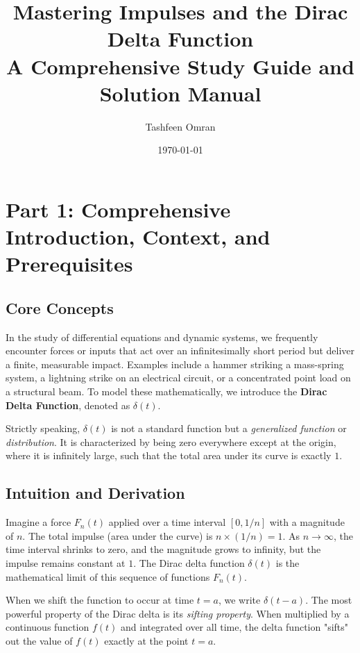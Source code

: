 \documentclass[11pt, letterpaper]{article}
\theoremstyle{definition}
\theoremstyle{remark}
\begin{document}
\title{\textbf{Mastering Impulses and the Dirac Delta Function}\\ \Large A Comprehensive Study Guide and Solution Manual}
\author{Tashfeen Omran}
\date{\today}
\maketitle

\tableofcontents
\newpage

\section{Part 1: Comprehensive Introduction, Context, and Prerequisites}

\subsection{Core Concepts}
In the study of differential equations and dynamic systems, we frequently encounter forces or inputs that act over an infinitesimally short period but deliver a finite, measurable impact. Examples include a hammer striking a mass-spring system, a lightning strike on an electrical circuit, or a concentrated point load on a structural beam. To model these mathematically, we introduce the \textbf{Dirac Delta Function}, denoted as $\delta(t)$. 

Strictly speaking, $\delta(t)$ is not a standard function but a \textit{generalized function} or \textit{distribution}. It is characterized by being zero everywhere except at the origin, where it is infinitely large, such that the total area under its curve is exactly $1$.

\subsection{Intuition and Derivation}
Imagine a force $F_n(t)$ applied over a time interval $[0, 1/n]$ with a magnitude of $n$. The total impulse (area under the curve) is $n \times (1/n) = 1$. As $n \to \infty$, the time interval shrinks to zero, and the magnitude grows to infinity, but the impulse remains constant at $1$. The Dirac delta function $\delta(t)$ is the mathematical limit of this sequence of functions $F_n(t)$. 

When we shift the function to occur at time $t = a$, we write $\delta(t-a)$. The most powerful property of the Dirac delta is its \textit{sifting property}. When multiplied by a continuous function $f(t)$ and integrated over all time, the delta function "sifts" out the value of $f(t)$ exactly at the point $t=a$.
\end{document}
